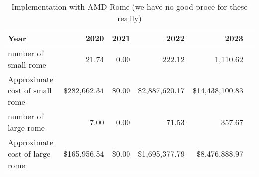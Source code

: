 \tiny \begin{longtable} { |p{}  |r  |r  |r  |r  |r |} 
\caption{Implementation with AMD Rome (we have no good proce for these reallly) \label{tab:Rome}}\\ 
\hline 
\textbf{Year}&\textbf{2020}&\textbf{2021}&\textbf{2022}&\textbf{2023} \\ \hline
{number of small rome }&{21.74}&{0.00}&{222.12}&{1,110.62} \\ \hline
{Approximate cost of small rome }&{\$282,662.34}&{\$0.00}&{\$2,887,620.17}&{\$14,438,100.83} \\ \hline
{number of large rome }&{7.00}&{0.00}&{71.53}&{357.67} \\ \hline
{Approximate cost of large rome }&{\$165,956.54}&{\$0.00}&{\$1,695,377.79}&{\$8,476,888.97} \\ \hline
\end{longtable} \normalsize
